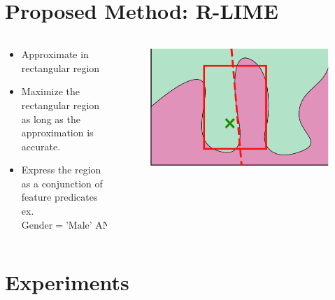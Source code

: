 \documentclass[aspectratio=169]{slide-en}
\begin{document}
\section{Proposed Method: R-LIME}

\begin{frame}{}
  \begin{columns}[]
    \begin{column}{0.55\textwidth}

      \bigskip
      \begin{itemize}
        \item Approximate in rectangular region
        \item Maximize the rectangular region as long as
              the approximation is accurate.
        \item Express the region as a conjunction of feature predicates \\
              \smallskip
              \footnotesize{
                ex. $\textrm{Gender} = \textrm{'Male' AND } 20\le\textrm{Age} < 30$
              }
      \end{itemize}
    \end{column}
    \begin{column}{0.40\textwidth}
      \begin{figure}
        \includegraphics[width=\textwidth]{img/visual-rlime3}
      \end{figure}
    \end{column}
  \end{columns}
\end{frame}

\section{Experiments}
\end{document}

